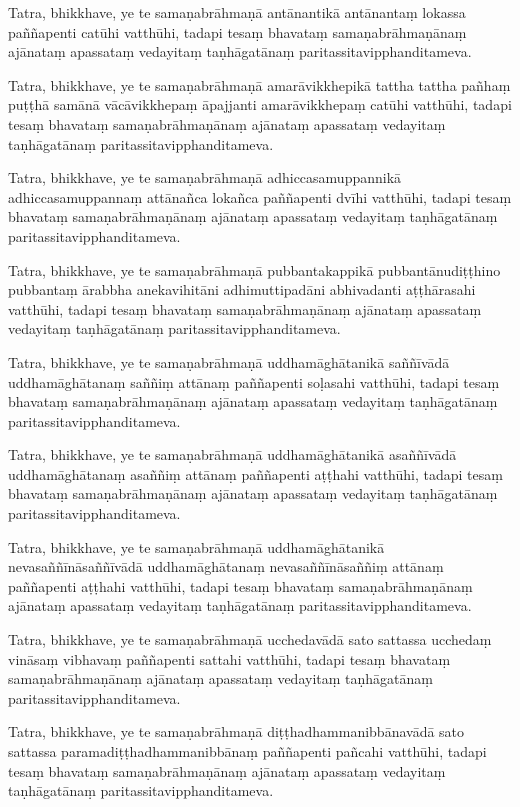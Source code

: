 \documentclass[11pt,twoside,openright]{book}
\begin{document}
\pstart
Tatra, bhikkhave, ye te samaṇabrāhmaṇā antānantikā antānantaṃ lokassa paññapenti catūhi vatthūhi, tadapi tesaṃ bhavataṃ samaṇabrāhmaṇānaṃ ajānataṃ apassataṃ vedayitaṃ taṇhāgatānaṃ paritassitavipphanditameva.
\pend

\pstart
Tatra, bhikkhave, ye te samaṇabrāhmaṇā amarāvikkhepikā tattha tattha pañhaṃ puṭṭhā samānā vācāvikkhepaṃ āpajjanti amarāvikkhepaṃ catūhi vatthūhi, tadapi tesaṃ bhavataṃ samaṇabrāhmaṇānaṃ ajānataṃ apassataṃ vedayitaṃ taṇhāgatānaṃ paritassitavipphanditameva.
\pend

\pstart
Tatra, bhikkhave, ye te samaṇabrāhmaṇā adhiccasamuppannikā adhiccasamuppannaṃ attānañca lokañca paññapenti dvīhi vatthūhi, tadapi tesaṃ bhavataṃ samaṇabrāhmaṇānaṃ ajānataṃ apassataṃ vedayitaṃ taṇhāgatānaṃ paritassitavipphanditameva.
\pend

\pstart
Tatra, bhikkhave, ye te samaṇabrāhmaṇā pubbantakappikā pubbantānudiṭṭhino pubbantaṃ ārabbha anekavihitāni adhimuttipadāni abhivadanti aṭṭhārasahi vatthūhi, tadapi tesaṃ bhavataṃ samaṇabrāhmaṇānaṃ ajānataṃ apassataṃ vedayitaṃ taṇhāgatānaṃ paritassitavipphanditameva.
\pend

\pstart
Tatra, bhikkhave, ye te samaṇabrāhmaṇā uddhamāghātanikā saññīvādā uddhamāghātanaṃ saññiṃ attānaṃ paññapenti soḷasahi vatthūhi, tadapi tesaṃ bhavataṃ samaṇabrāhmaṇānaṃ ajānataṃ apassataṃ vedayitaṃ taṇhāgatānaṃ paritassitavipphanditameva.
\pend

\pstart
Tatra, bhikkhave, ye te samaṇabrāhmaṇā uddhamāghātanikā asaññīvādā uddhamāghātanaṃ asaññiṃ attānaṃ paññapenti aṭṭhahi vatthūhi, tadapi tesaṃ bhavataṃ samaṇabrāhmaṇānaṃ ajānataṃ apassataṃ vedayitaṃ taṇhāgatānaṃ paritassitavipphanditameva.
\pend

\pstart
Tatra, bhikkhave, ye te samaṇabrāhmaṇā uddhamāghātanikā nevasaññīnāsaññīvādā uddhamāghātanaṃ nevasaññīnāsaññiṃ attānaṃ paññapenti aṭṭhahi vatthūhi, tadapi tesaṃ bhavataṃ samaṇabrāhmaṇānaṃ ajānataṃ apassataṃ vedayitaṃ taṇhāgatānaṃ paritassitavipphanditameva.
\pend

\pstart
Tatra, bhikkhave, ye te samaṇabrāhmaṇā ucchedavādā sato sattassa ucchedaṃ vināsaṃ vibhavaṃ paññapenti sattahi vatthūhi, tadapi tesaṃ bhavataṃ samaṇabrāhmaṇānaṃ ajānataṃ apassataṃ vedayitaṃ taṇhāgatānaṃ paritassitavipphanditameva.
\pend

\pstart
Tatra, bhikkhave, ye te samaṇabrāhmaṇā diṭṭhadhammanibbānavādā sato sattassa paramadiṭṭhadhammanibbānaṃ paññapenti pañcahi vatthūhi, tadapi tesaṃ bhavataṃ samaṇabrāhmaṇānaṃ ajānataṃ apassataṃ vedayitaṃ taṇhāgatānaṃ paritassitavipphanditameva.
\pend
\end{document}
